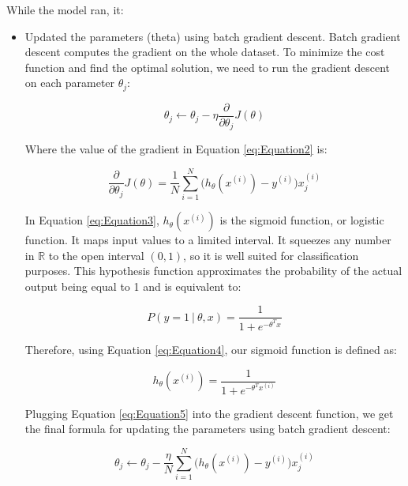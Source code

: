 While the model ran, it:
\begin{itemize}
    \item Updated the parameters (theta) using batch gradient descent. Batch gradient descent computes the gradient on the whole dataset. To minimize the cost function and find the optimal solution, we need to run the gradient descent on each parameter $\theta_{j}$:

    \begin{equation}
        \label{eq:Equation2}
        \theta_{j} \leftarrow \theta_{j} - \eta \dfrac{\partial}{\partial{\theta_{j}}} J(\theta)
    \end{equation}

    Where the value of the gradient in Equation \eqref{eq:Equation2} is:

    \begin{equation}
        \label{eq:Equation3}
        \dfrac{\partial}{\partial{\theta_{j}}} J(\theta) = \dfrac{1}{N} \sum_{i = 1}^{N} \Big(h_{\theta}(x^{(i)}) - y^{(i)}\Big)x_{j}^{(i)}
    \end{equation}

    In Equation \eqref{eq:Equation3}, $h_{\theta}(x^{(i)})$ is the sigmoid function, or logistic function. It maps input values to a limited interval. It squeezes any number in $\mathbb{R}$ to the open interval $(0, 1)$, so it is well suited for classification purposes. This hypothesis function approximates the probability of the actual output being equal to 1 and is equivalent to:

    \begin{equation}
        \label{eq:Equation4}
        P(y = 1 \ | \ \theta,x) = \dfrac{1}{1 + e^{-\theta^{T}x}}
    \end{equation}

    Therefore, using Equation \eqref{eq:Equation4}, our sigmoid function is defined as:

    \begin{equation}
        \label{eq:Equation5}
        h_{\theta}(x^{(i)}) = \dfrac{1}{1 + e^{-\theta^{T}x^{(i)}}}
    \end{equation}

    Plugging Equation \eqref{eq:Equation5} into the gradient descent function, we get the final formula for updating the parameters using batch gradient descent:

    \begin{equation}
        \label{eq:Equation6}
        \theta_{j} \leftarrow \theta_{j} - \dfrac{\eta}{N} \sum_{i = 1}^{N} \Big(h_{\theta}(x^{(i)}) - y^{(i)}\Big)x_{j}^{(i)}
    \end{equation}


\end{itemize}
